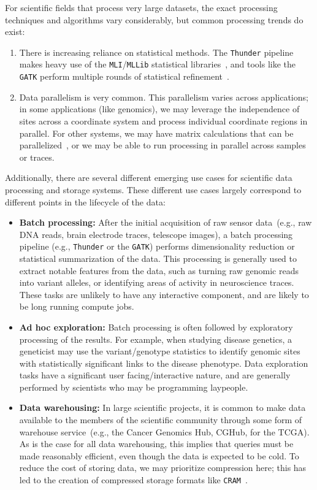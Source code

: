 \documentclass{acm_proc_article-sp}
\begin{document}
For scientific fields that process very large datasets, the exact processing techniques and algorithms vary
considerably, but common processing trends do exist:

\begin{enumerate}
\item There is increasing reliance on statistical methods. The \texttt{Thunder} pipeline makes heavy use
of the \texttt{MLI}/\texttt{MLLib} statistical libraries~\cite{freeman14, sparks13}, and tools like the \texttt{GATK} perform
multiple rounds of statistical refinement~\cite{depristo11}.
\item Data parallelism is very common. This parallelism varies across applications; in some applications (like
genomics), we may leverage the independence of sites across a coordinate system and process
individual coordinate regions in parallel. For other systems, we may have matrix calculations that can
be parallelized~\cite{sparks13}, or we may be able to run processing in parallel across samples or traces.
\end{enumerate}

Additionally, there are several different emerging use cases for scientific data processing and storage
systems. These different use cases largely correspond to different points in the lifecycle of the data:

\begin{itemize}
\item \textbf{Batch processing:} After the initial acquisition of raw sensor data~(e.g., raw DNA reads,
brain electrode traces, telescope images), a batch processing pipeline (e.g., \texttt{Thunder} or
the \texttt{GATK}) performs dimensionality reduction or statistical summarization of the data. This processing is
generally used to extract notable features from the data, such as turning raw genomic reads into variant
alleles, or identifying areas of activity in neuroscience traces. These tasks are unlikely to have any
interactive component, and are likely to be long running compute jobs.
\item \textbf{Ad hoc exploration:} Batch processing is often followed by
exploratory processing of the results. For example, when studying disease genetics, a geneticist may
use the variant/genotype statistics to identify genomic sites with statistically significant links to the
disease phenotype. Data exploration tasks have a significant user facing/interactive nature, and are
generally performed by scientists who may be programming laypeople.
\item \textbf{Data warehousing:} In large scientific projects, it is common to make data available to the
members of the scientific community through some form of warehouse service~(e.g., the Cancer
Genomics Hub, CGHub, for the TCGA). As is the case for all data warehousing, this implies that queries
must be made reasonably efficient, even though the data is expected to be cold. To reduce the cost of
storing data, we may prioritize compression here; this has led to the creation of compressed storage
formats like \texttt{CRAM}~\cite{fritz11}.
\end{itemize}
\end{document}
